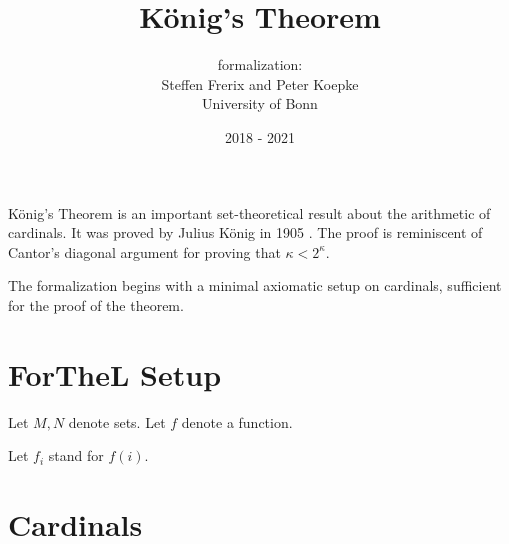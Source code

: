 \documentclass{article}
\title{König's Theorem}
\author{\Naproche formalization: \vspace{0.5em} \\
Steffen Frerix and Peter Koepke \\
University of Bonn}
\date{2018 - 2021}
\begin{document}
\maketitle

\noindent König's Theorem is an important set-theoretical result about the
arithmetic of cardinals.
It was proved by Julius König in 1905 \cite[p. 177--180]{Koenig1905}.
The proof is reminiscent of Cantor's diagonal argument for proving that
$\kappa < 2^\kappa$.

The formalization begins with a minimal axiomatic setup on cardinals,
sufficient for the proof of the theorem.


\section{ForTheL Setup}

\begin{forthel}

  Let $M, N$ denote sets.
  Let $f$ denote a function.

  Let $f_{i}$ stand for $f(i)$.
\end{forthel}


\section{Cardinals}
\end{document}
